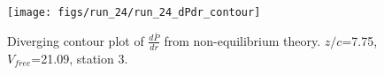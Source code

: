 \begin{figure}[H]
\centering
\texttt{[image: figs/run\_24/run\_24\_dPdr\_contour]}
\caption{Diverging contour plot of $\frac{d\bar{P}}{dr}$ from non-equilibrium theory. $z/c$=7.75, $V_{free}$=21.09, station 3.}
\label{fig:run_24_dPdr_contour}
\end{figure}


